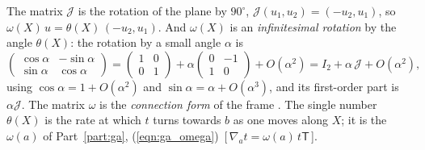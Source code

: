 The matrix $\mathcal J$ is the rotation of the plane by $90^\circ$, $\mathcal J(u_1, u_2) = (-u_2, u_1)$, so $\omega(X)\,u = \theta(X)\,(-u_2, u_1)$. And $\omega(X)$ is an \emph{infinitesimal rotation} by the angle $\theta(X)$: the rotation by a small angle $\alpha$ is
\begin{equation*}
\begin{pmatrix} \cos\alpha & -\sin\alpha \\ \sin\alpha & \cos\alpha \end{pmatrix} = \begin{pmatrix} 1 & 0 \\ 0 & 1 \end{pmatrix} + \alpha \begin{pmatrix} 0 & -1 \\ 1 & 0 \end{pmatrix} + O(\alpha^2) = I_2 + \alpha\, \mathcal J + O(\alpha^2),
\end{equation*}
using $\cos\alpha = 1 + O(\alpha^2)$ and $\sin\alpha = \alpha + O(\alpha^3)$, and its first-order part is $\alpha \mathcal J$. The matrix $\omega$ is the \emph{connection form} of the frame \cite{Liu2016}. The single number $\theta(X)$ is the rate at which $t$ turns towards $b$ as one moves along $X$; it is the $\omega(a)$ of Part~\ref{part:ga}, (\ref{eqn:ga_omega})~[\,$\nabla_a t = \omega(a)\, t\mathsf T$\,].

